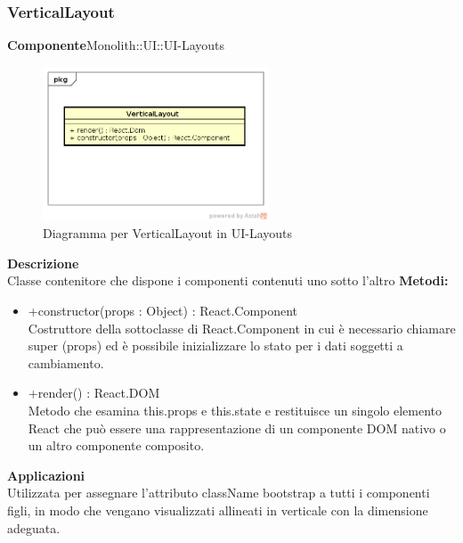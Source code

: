 \subsubsection{VerticalLayout}
\textbf{Componente}Monolith::UI::UI-Layouts\\
   \FloatBarrier
   \begin{figure}[ht]
   \centering
   \includegraphics[width=0.6\textwidth]{img/single-VerticalLayout}
   \caption{{Diagramma per VerticalLayout in UI-Layouts}}
\end{figure}
\FloatBarrier
\textbf{Descrizione}\\
Classe contenitore che dispone i componenti contenuti uno sotto l'altro
\textbf{Metodi:} \begin{itemize}\item +constructor(props : Object) : React.Component \\Costruttore della sottoclasse di React.Component in cui è necessario chiamare super (props) ed è possibile inizializzare lo stato per i dati soggetti a cambiamento.\item +render() : React.DOM \\Metodo che esamina this.props e this.state e restituisce un singolo elemento React che può essere una rappresentazione di un componente DOM nativo o un altro componente composito.\end{itemize} 


\textbf{Applicazioni}\\
Utilizzata per assegnare l'attributo className bootstrap a tutti i componenti figli, in modo che vengano visualizzati allineati in verticale con la dimensione adeguata. 


\clearpage

